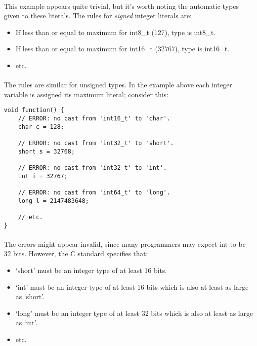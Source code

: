 \documentclass[12pt,twoside,notitlepage]{report}
\begin{document}
\paragraph{}
This example appears quite trivial, but it's worth noting the automatic types given to these literals. The rules for \emph{signed} integer literals are:

\begin{itemize}
\item If less than or equal to maximum for int8\_t (127), type is int8\_t.
\item If less than or equal to maximum for int16\_t (32767), type is int16\_t.
\item etc.
\end{itemize}

\paragraph{}
The rules are similar for unsigned types. In the example above each integer variable is assigned its maximum literal; consider this:

\begin{lstlisting}
void function() {
	// ERROR: no cast from 'int16_t' to 'char'.
	char c = 128;
	
	// ERROR: no cast from 'int32_t' to 'short'.
	short s = 32768;
	
	// ERROR: no cast from 'int32_t' to 'int'.
	int i = 32767;
	
	// ERROR: no cast from 'int64_t' to 'long'.
	long l = 2147483648;
	
	// etc.
}
\end{lstlisting}

\paragraph{}
The errors might appear invalid, since many programmers may expect int to be 32 bits. However, the C standard specifies that:

\begin{itemize}
\item `short' must be an integer type of at least 16 bits.
\item `int' must be an integer type of at least 16 bits which is also at least as large as `short'.
\item `long' must be an integer type of at least 32 bits which is also at least as large as `int'.
\item etc.
\end{itemize}
\end{document}
